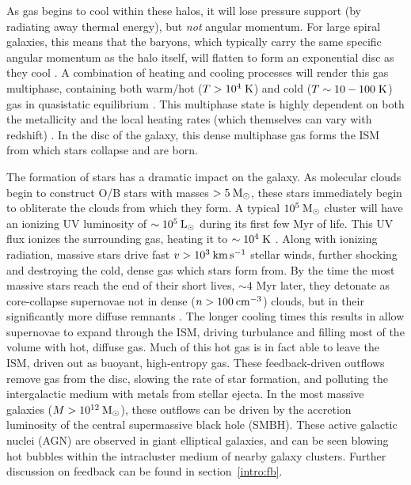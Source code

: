 As gas begins to cool within these halos, it will lose pressure support (by
radiating away thermal energy), but {\it not} angular momentum.  For large
spiral galaxies, this means that the baryons, which typically carry the same
specific angular momentum as the halo itself, will flatten to form an
exponential disc as they cool \citep{Fall1980,Mo1998}.    A combination
of heating and cooling processes will render this gas multiphase, containing
both warm/hot ($T>10^4\;\rm{K}$) and cold ($T\sim10-100\;\rm{K}$) gas in
quasistatic equilibrium \citep{McKee1977}.  This multiphase state is highly
dependent on both the metallicity and the local heating rates (which
themselves can vary with redshift) \citep{Field1969,Wolfire1995,Norman1997}.  In
the disc of the galaxy, this dense multiphase gas forms the ISM from which stars
collapse and are born.

The formation of stars has a dramatic impact on the galaxy.  As molecular clouds
begin to construct O/B stars with masses $>5\>{\rm M_{\odot}}$, these stars immediately
begin to obliterate the clouds from which they form.  A typical $10^5\>{\rm M_{\odot}}$
cluster will have an ionizing UV luminosity of $\sim10^5\>{\rm L_{\odot}}$ during its first
few Myr of life.  This UV flux ionizes the surrounding gas, heating it to
$\sim10^4\;\rm{K}$ \citep{Dale2005,Murray2011}.  Along with ionizing radiation,
massive stars drive fast $v>10^3\>{\rm km}\,{\rm s}^{-1}$ stellar winds, further shocking and
destroying the cold, dense gas which stars form from.  By the time the most
massive stars reach the end of their short lives, $\sim4$ Myr later, they
detonate as core-collapse supernovae not in dense ($n>100\>{\rm cm^{-3}}$) clouds, but in
their significantly more diffuse remnants \citep{Rogers2013}.  The longer
cooling times this results in allow supernovae to expand through the ISM,
driving turbulance \citep{Ostriker2010} and filling most of the volume with hot,
diffuse gas.  Much of this hot gas is in fact able to leave the ISM, driven out
as buoyant, high-entropy gas.  These feedback-driven outflows remove gas
from the disc, slowing the rate of star formation, and polluting the
intergalactic medium with metals from stellar ejecta.  In the most massive
galaxies ($M>10^{12}\>{\rm M_{\odot}}$), these outflows can be driven by the accretion
luminosity of the central supermassive black hole (SMBH).  These active galactic
nuclei (AGN) are observed in giant elliptical galaxies, and can be seen blowing
hot bubbles within the intracluster medium of nearby galaxy clusters.  Further
discussion on feedback can be found in section~\ref{intro:fb}.

